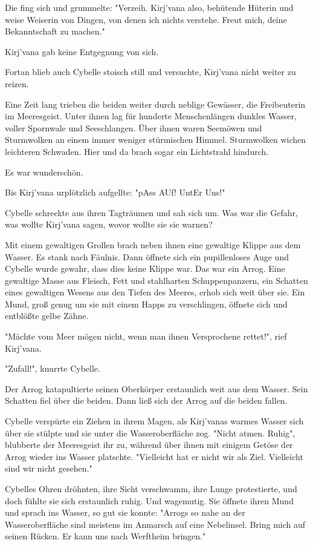 Die fing sich und grummelte: "Verzeih. Kirj'vana also, behütende Hüterin und weise Weiserin von Dingen, von denen ich nichts verstehe. Freut mich, deine Bekanntschaft zu machen."

Kirj'vana gab keine Entgegnung von sich.

Fortan blieb auch Cybelle stoisch still und versuchte, Kirj'vana nicht weiter zu reizen.

Eine Zeit lang trieben die beiden weiter durch neblige Gewässer, die Freibeuterin im Meeresgeist. Unter ihnen lag für hunderte Menschenlängen dunkles Wasser, voller Spornwale und Seeschlangen. Über ihnen waren Seemöwen und Sturmwolken an einem immer weniger stürmischen Himmel. Sturmwolken wichen leichteren Schwaden. Hier und da brach sogar ein Lichtstrahl hindurch.

Es war wunderschön.

Bis Kirj'vana urplötzlich aufgellte: "pAss AUf! UntEr Uns!"

Cybelle schreckte aus ihren Tagträumen und sah sich um. Was war die Gefahr, was wollte Kirj'vana sagen, wovor wollte sie sie warnen?

Mit einem gewaltigen Grollen brach neben ihnen eine gewaltige Klippe aus dem Wasser. Es stank nach Fäulnis. Dann öffnete sich ein pupillenloses Auge und Cybelle wurde gewahr, dass dies keine Klippe war. Das war ein Arrog. Eine gewaltige Masse aus Fleisch, Fett und stahlharten Schuppenpanzern, ein Schatten eines gewaltigen Wesens aus den Tiefen des Meeres, erhob sich weit über sie. Ein Mund, groß genug um sie mit einem Happs zu verschlingen, öffnete sich und entblößte gelbe Zähne. 

"Mächte vom Meer mögen nicht, wenn man ihnen Versprochene rettet!", rief Kirj'vana.

"Zufall!", knurrte Cybelle. 

Der Arrog katapultierte seinen Oberkörper erstaunlich weit aus dem Wasser. Sein Schatten fiel über die beiden. Dann ließ sich der Arrog auf die beiden fallen. 

Cybelle verspürte ein Ziehen in ihrem Magen, als Kirj'vanas warmes Wasser sich über sie stülpte und sie unter die Wasseroberfläche zog.  "Nicht atmen. Ruhig", blubberte der Meeresgeist ihr zu, während über ihnen mit einigem Getöse der Arrog wieder ins Wasser platschte. "Vielleicht hat er nicht wir als Ziel. Vielleicht sind wir nicht gesehen."

Cybelles Ohren dröhnten, ihre Sicht verschwamm, ihre Lunge protestierte, und doch fühlte sie sich erstaunlich ruhig. Und wagemutig. Sie öffnete ihren Mund und sprach ins Wasser, so gut sie konnte: "Arrogs so nahe an der Wasseroberfläche sind meistens im Anmarsch auf eine Nebelinsel. Bring mich auf seinen Rücken. Er kann uns nach Werftheim bringen."

